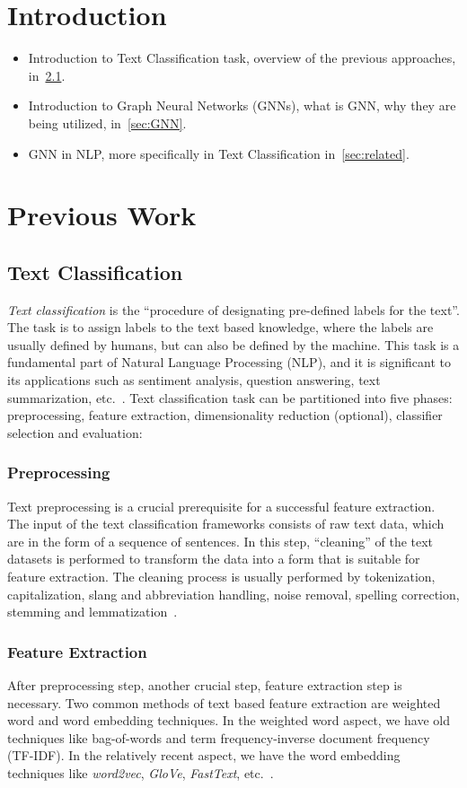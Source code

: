 \section{Introduction}
\begin{itemize}
    \item Introduction to Text Classification task, overview of the previous approaches, in~\cref{sec:TC}.
    \item Introduction to Graph Neural Networks (GNNs), what is GNN, why they are being utilized, in~\cref{sec:GNN}.
    \item GNN in NLP, more specifically in Text Classification in~\cref{sec:related}.
\end{itemize}

\section{Previous Work}
\subsection{Text Classification}\label{sec:TC}
\emph{Text classification} is the ``procedure of designating pre-defined labels for the text''. The task is to assign labels to the text based knowledge, where the labels are usually defined by humans, but can also be defined by the machine. This task is a fundamental part of Natural Language Processing (NLP), and it is significant to its applications such as sentiment analysis, question answering, text summarization, etc.~\autocite{li20tc}. Text classification task can be partitioned into five phases: preprocessing, feature extraction, dimensionality reduction (optional), classifier selection and evaluation:

\subsubsection{Preprocessing}
Text preprocessing is a crucial prerequisite for a successful feature extraction. The input of the text classification frameworks consists of raw text data, which are in the form of a sequence of sentences. In this step, ``cleaning'' of the text datasets is performed to transform the data into a form that is suitable for feature extraction. The cleaning process is usually performed by tokenization, capitalization, slang and abbreviation handling, noise removal, spelling correction, stemming and lemmatization~\autocite{kowsari19tc}.

\subsubsection{Feature Extraction}
After preprocessing step, another crucial step, feature extraction step is necessary. Two common methods of text based feature extraction are weighted word and word embedding techniques. In the weighted word aspect, we have old techniques like bag-of-words and term frequency-inverse document frequency (TF-IDF). In the relatively recent aspect, we have the word embedding techniques like \emph{word2vec}, \emph{GloVe}, \emph{FastText}, etc.~\autocite{li20tc}.

